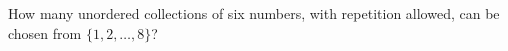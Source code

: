 How many unordered collections of six numbers, with repetition allowed, can be chosen from $\{1,2,\ldots,8\}$?
